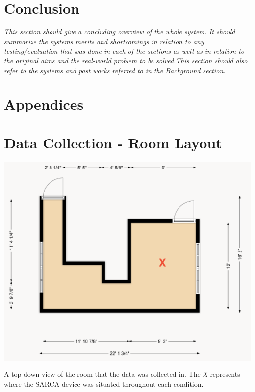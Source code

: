 \documentclass{ueacmpstyle}
\begin{document}
    \section{Conclusion} \label{Sec: Conclusion}
        \textit{This  section  should  give  a concluding  overview  of  the  whole  system.  It  should  summarize  the  systems merits and shortcomings in relation to any testing/evaluation that was done in each of the sections as well as in relation to the original aims and the real-world problem to be solved.This section should also refer to the systems and past works referred to in the Background section.}

    
    
    
    
    \newpage
    \section{Appendices}
    \appendix
        \section{Data Collection - Room Layout}\label{app:roomlayout}
        \begin{center}
            \includegraphics[scale=0.5]{Images/room.png}
        \end{center}
        A top down view of the room that the data was collected in. The \textit{X} represents where the SARCA device was situated throughout each condition. 
        
\end{document}
